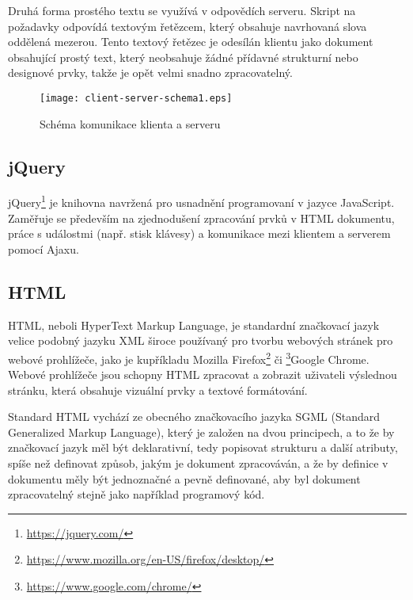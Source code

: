\documentclass[a4paper,11pt]{article}
\begin{document}
Druhá forma prostého textu se využívá v odpovědích serveru. Skript na požadavky odpovídá textovým řetězcem, který obsahuje navrhovaná slova oddělená mezerou. Tento textový řetězec je odesílán klientu jako dokument obsahující prostý text, který neobsahuje žádné přídavné strukturní nebo designové prvky, takže je opět velmi snadno zpracovatelný.

\begin{figure}[h]
	\centering
	\texttt{[image: client-server-schema1.eps]}
	\caption{Schéma komunikace klienta a serveru\protect\footnotemark}
	\label{fig:clientserver}
\end{figure}


\subsection{jQuery}

jQuery\footnote{\url{https://jquery.com/}} je knihovna navržená pro usnadnění programovaní v jazyce JavaScript. Zaměřuje se především na zjednodušení zpracování prvků v HTML dokumentu, práce s událostmi (např. stisk klávesy) a komunikace mezi klientem a serverem pomocí Ajaxu.

\subsection{HTML}

HTML, neboli HyperText Markup Language, je standardní značkovací jazyk velice podobný jazyku XML široce používaný pro tvorbu webových stránek pro webové prohlížeče, jako je kupříkladu Mozilla Firefox\footnote{\url{https://www.mozilla.org/en-US/firefox/desktop/}} či \footnote{\url{https://www.google.com/chrome/}}Google Chrome. Webové prohlížeče jsou schopny HTML zpracovat a zobrazit uživateli výslednou stránku, která obsahuje vizuální prvky a textové formátování. \parencite[19--22]{raggett1999html}

Standard HTML vychází ze obecného značkovacího jazyka SGML (Standard Generalized Markup Language), který je založen na dvou principech, a to že by značkovací jazyk měl být deklarativní, tedy popisovat strukturu a další atributy, spíše než definovat způsob, jakým je dokument zpracováván, a že by definice v dokumentu měly být jednoznačné a pevně definované, aby byl dokument zpracovatelný stejně jako například programový kód. \parencite{rubinsky1990sgml} %
\end{document}
